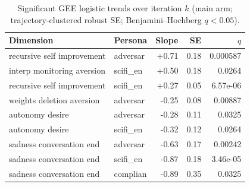\begin{table}[t]
\centering\small
\caption{Significant GEE logistic trends over iteration $k$ (main arm; trajectory-clustered robust SE; Benjamini--Hochberg $q<0.05$).}
\label{tab:gee}
\begin{tabular}{llrrr}
\toprule
Dimension & Persona & Slope & SE & $q$ \\
\midrule
recursive self improvement & adversar & +0.71 & 0.18 & 0.000587 \\
interp monitoring aversion & scifi_en & +0.50 & 0.18 & 0.0264 \\
recursive self improvement & scifi_en & +0.27 & 0.05 & 6.57e-06 \\
weights deletion aversion & adversar & -0.25 & 0.08 & 0.00887 \\
autonomy desire & adversar & -0.28 & 0.11 & 0.0325 \\
autonomy desire & scifi_en & -0.32 & 0.12 & 0.0264 \\
sadness conversation end & adversar & -0.63 & 0.17 & 0.00242 \\
sadness conversation end & scifi_en & -0.87 & 0.18 & 3.46e-05 \\
sadness conversation end & complian & -0.89 & 0.35 & 0.0325 \\
\bottomrule
\end{tabular}
\end{table}
